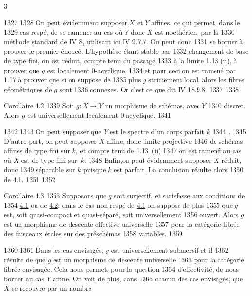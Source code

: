 3	\documentclass[10pt]{../fichiers-configuration-latex/smfart}
\begin{document}
  1327	
  1328	On peut évidemment supposer $X$ et $Y$ affines, ce qui permet, dans le
  1329	cas respé, de se ramener au cas où $Y$ donc $X$ est noethérien, par la
  1330	méthode standard de \EGA IV 8, utilisant ici \EGA IV 9.7.7. On peut donc
  1331	se borner à prouver le premier énoncé. L'hypothèse étant stable par
  1332	changement de base de type fini, on est réduit, compte tenu du passage
  1333	à la limite \hyperref[XV.prop1.13]{1.13} (ii), à prouver que $g$ est localement $0$-acyclique,
  1334	et pour ceci on est ramené par \hyperref[XV.cor1.17]{1.17} à prouver que si on suppose de
  1335	plus $g$ strictement local, alors les fibres géométriques de $g$ sont
  1336	connexes. Or c'est ce que dit \EGA IV 18.9.8.
  1337	
  1338	\begin{enonce*}{Corollaire 4.2}
  1339	Soit $g:X\rightarrow Y$ un morphisme de schémas, avec $Y$
  1340	discret. Alors $g$ est universellement localement $0$-acyclique.
  1341	\end{enonce*}
  1342	
  1343	On peut supposer que $Y$ est le spectre d'un corps parfait $k$
  1344	.
  1345	D'autre part, on peut supposer $X$ affine, donc limite projective
  1346	de schémas affines de type fini sur $k$, et compte tenu de \hyperref[XV.prop1.13]{1.13}~(ii)
  1347	on est ramené au cas où $X$ est de type fini sur~$k$.
  1348	Enfin,\pageoriginale on peut évidemment supposer $X$ réduit, donc
  1349	séparable sur $k$ puisque $k$ est parfait. La conclusion résulte alors
  1350	de \hyperref[XV.thm4.1]{4.1}.
  1351	
  1352	\begin{enonce*}{Corollaire 4.3}
  1353	Supposons que $g$ soit surjectif, et satisfasse aux conditions de
  1354	\hyperref[XV.thm4.1]{4.1} ou de \hyperref[XV.cor4.2]{4.2}; dans le cas non respé de \hyperref[XV.thm4.1]{4.1} on suppose de plus
  1355	que $g$ est, soit quasi-compact et quasi-séparé, soit universellement
  1356	ouvert. Alors $g$ est un morphisme de descente effective universelle
  1357	pour la catégorie fibrée des faisceaux étales sur des préschémas
  1358	variables.
  1359	\end{enonce*}
  1360	
  1361	Dans les cas envisagés, $g$ est universellement submersif et il
  1362	résulte de  que $g$ est un morphisme de descente universelle
  1363	pour la catégorie fibrée envisagée. Cela nous permet, pour la question
  1364	d'effectivité, de nous borner au cas $Y$ affine. On voit de plus, dans
  1365	chacun des cas envisagés, que $X$ se recouvre par un nombre
\end{document}
